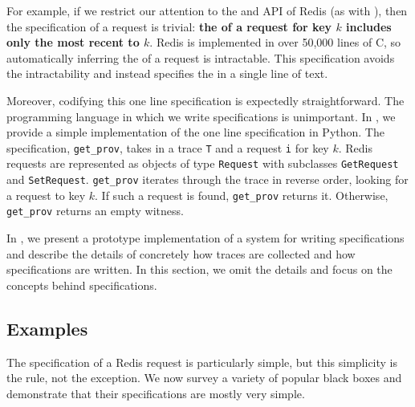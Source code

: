 For example, if we restrict our attention to the \kvget{} and \kvset{} API of
Redis (as with ), then the \watprovenance{}
specification of a \kvget{} request is trivial: \textbf{the \watprovenance{} of
a \kvget{} request for key $k$ includes only the most recent \kvset{} to
$k$}. Redis is implemented in over 50,000 lines of C, so automatically
inferring the \watprovenance{} of a \kvget{} request is intractable. This
\watprovenance{} specification avoids the intractability and instead specifies
the \watprovenance{} in a single line of text.

Moreover, codifying this one line \watprovenance{} specification is expectedly
straightforward. The programming language in which we write \watprovenance{}
specifications is unimportant. In , we provide a simple
implementation of the one line \watprovenance{} specification in Python. The
specification, \texttt{get\_prov}, takes in a trace \texttt{T} and a \kvget{}
request \texttt{i} for key $k$. Redis requests are represented as objects of
type \texttt{Request} with subclasses \texttt{GetRequest} and
\texttt{SetRequest}.  \texttt{get\_prov} iterates through the trace in reverse
order, looking for a \kvset{} request to key $k$. If such a \kvset{} request is
found, \texttt{get\_prov} returns it. Otherwise, \texttt{get\_prov} returns an
empty witness.

{}

In , we present a prototype
implementation of a system for writing \watprovenance{} specifications and
describe the details of concretely how traces are collected and how
\watprovenance{} specifications are written. In this section, we omit the
details and focus on the concepts behind \watprovenance{} specifications.

\subsection{Examples}
The \watprovenance{} specification of a Redis \kvget{} request is particularly
simple, but this simplicity is the rule, not the exception. We now survey a
variety of popular black boxes and demonstrate that their \watprovenance{}
specifications are mostly very simple.

